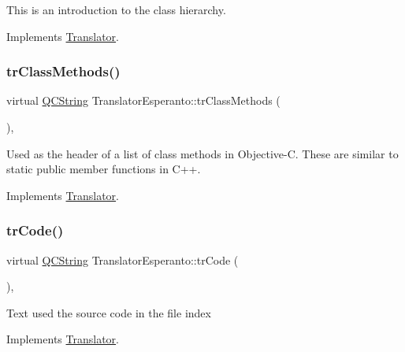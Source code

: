 This is an introduction to the class hierarchy. 

Implements \mbox{\hyperlink{class_translator}{Translator}}.

\mbox{\label{class_translator_esperanto_a8ab3d64e0f5a2bb24e8164e4ec35817a}} 
\subsubsection{\texorpdfstring{trClassMethods()}{trClassMethods()}}
{\footnotesize\ttfamily virtual \mbox{\hyperlink{class_q_c_string}{Q\+C\+String}} Translator\+Esperanto\+::tr\+Class\+Methods (\begin{DoxyParamCaption}{ }\end{DoxyParamCaption})\hspace{0.3cm}{\ttfamily [inline]}, {\ttfamily [virtual]}}

Used as the header of a list of class methods in Objective-\/C. These are similar to static public member functions in C++. 

Implements \mbox{\hyperlink{class_translator}{Translator}}.

\mbox{\label{class_translator_esperanto_a7a4b04a1bd7248b932ea9cfc91d09f17}} 
\subsubsection{\texorpdfstring{trCode()}{trCode()}}
{\footnotesize\ttfamily virtual \mbox{\hyperlink{class_q_c_string}{Q\+C\+String}} Translator\+Esperanto\+::tr\+Code (\begin{DoxyParamCaption}{ }\end{DoxyParamCaption})\hspace{0.3cm}{\ttfamily [inline]}, {\ttfamily [virtual]}}

Text used the source code in the file index 

Implements \mbox{\hyperlink{class_translator}{Translator}}.

\mbox{\label{class_translator_esperanto_ae19795204b1019ea0f5259a53871d720}} 

